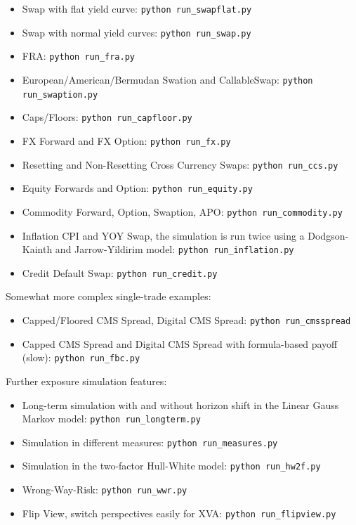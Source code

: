 \begin{itemize}
\item Swap with flat yield curve: {\tt python run\_swapflat.py}
\item Swap with normal yield curves: {\tt python run\_swap.py}
\item FRA: {\tt python run\_fra.py}
\item European/American/Bermudan Swation and CallableSwap: {\tt python run\_swaption.py}
\item Caps/Floors: {\tt python run\_capfloor.py}
\item FX Forward and FX Option: {\tt python run\_fx.py}
\item Resetting and Non-Resetting Cross Currency Swaps: {\tt python run\_ccs.py}
\item Equity Forwards and Option: {\tt python run\_equity.py}
\item Commodity Forward, Option, Swaption, APO: {\tt python run\_commodity.py}
\item Inflation CPI and YOY Swap, the simulation is run twice using a Dodgson-Kainth and Jarrow-Yildirim model: {\tt python run\_inflation.py}
\item Credit Default Swap: {\tt python run\_credit.py}
\end{itemize}

Somewhat more complex single-trade examples:
\begin{itemize}
\item Capped/Floored CMS Spread, Digital CMS Spread: {\tt python run\_cmsspread}
\item Capped CMS Spread and Digital CMS Spread with formula-based payoff (slow): {\tt python run\_fbc.py}
\end{itemize}

Further exposure simulation features:
\begin{itemize}
\item Long-term simulation with and without horizon shift in the Linear Gauss Markov model: {\tt python run\_longterm.py}
\item Simulation in different measures: {\tt python run\_measures.py}
\item Simulation in the two-factor Hull-White model: {\tt python run\_hw2f.py}
\item Wrong-Way-Risk: {\tt python run\_wwr.py}
\item Flip View, switch perspectives easily for XVA: {\tt python run\_flipview.py}
\end{itemize}

